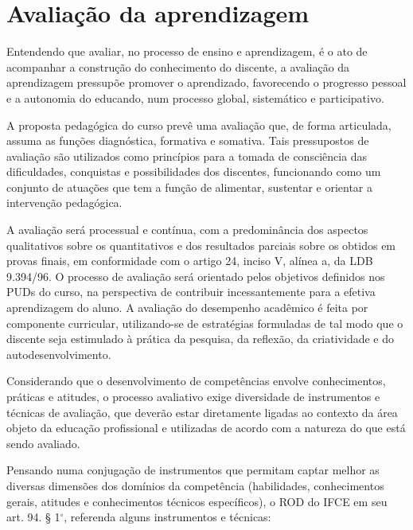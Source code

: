 \documentclass[
	12pt,				%
	openright,			%
	twoside,			%
	a4paper,			%
	chapter=TITLE,		%
	english,			%
	french,				%
	spanish,			%
	brazil,				%
	]{abntex2}
\begin{document}
\color{black}

\chapter{Avaliação da aprendizagem}

Entendendo que avaliar, no processo de ensino e aprendizagem, é o ato de acompanhar a construção do conhecimento do discente, a avaliação da aprendizagem pressupõe promover o aprendizado, favorecendo o progresso pessoal e a autonomia do educando, num processo global, sistemático e participativo.

A proposta pedagógica do curso prevê uma avaliação que, de forma articulada, assuma as funções diagnóstica, formativa e somativa. Tais pressupostos de avaliação são utilizados como princípios para a tomada de consciência das dificuldades, conquistas e possibilidades dos discentes, funcionando como um conjunto de atuações que tem a função de alimentar, sustentar e orientar a intervenção pedagógica.

A avaliação será processual e contínua, com a predominância dos aspectos qualitativos sobre os quantitativos e dos resultados parciais sobre os obtidos em provas finais, em conformidade com o artigo 24, inciso V, alínea a, da LDB 9.394/96. O processo de avaliação será orientado pelos objetivos definidos nos PUDs do curso, na perspectiva de contribuir incessantemente para a efetiva aprendizagem do aluno. A avaliação do desempenho acadêmico é feita por componente curricular, utilizando-se de estratégias formuladas de tal modo que o discente seja estimulado à prática da pesquisa, da reflexão, da criatividade e do autodesenvolvimento.


Considerando que o desenvolvimento de competências envolve conhecimentos, práticas e atitudes, o processo avaliativo exige diversidade de instrumentos e técnicas de avaliação, que deverão estar diretamente ligadas ao contexto da área objeto da educação profissional e utilizadas de acordo com a natureza do que está sendo avaliado.

Pensando numa conjugação de instrumentos que permitam captar melhor as diversas dimensões dos domínios da competência (habilidades, conhecimentos gerais, atitudes e conhecimentos técnicos específicos), o ROD do IFCE em seu art. 94. § 1$^\circ$, referenda alguns instrumentos e técnicas:
\end{document}
